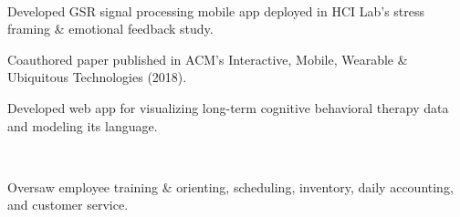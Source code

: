 \documentclass[]{hieudo-build}
\begin{document}
\begin{minipage}[t]{0.63\textwidth}
 \\
\begin{tightemize}
\item Developed GSR signal processing mobile app deployed in HCI Lab's stress framing \& emotional feedback study. \\
\smallskip
{}
\item Coauthored paper published in ACM's
Interactive, Mobile, Wearable \& Ubiquitous Technologies (2018). \\
\end{tightemize}
\smallskip

\begin{tightemize}
\item Developed web app for visualizing long-term cognitive behavioral therapy data and modeling its language. \\
\smallskip
{}
\end{tightemize}
\sectionsep


 \\
\begin{tightemize}
\item Oversaw employee training \& orienting, scheduling, inventory, daily accounting, and customer service.
\end{tightemize}
\sectionsep

%
%
\end{minipage} 
\end{document}
